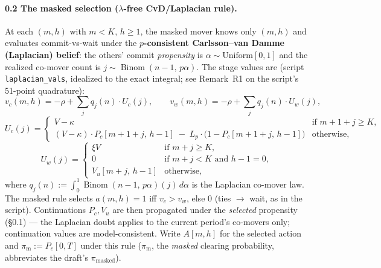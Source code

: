 \paragraph{0.2 The masked selection ($\lambda$-free CvD/Laplacian rule).}
At each $(m,h)$ with $m < K$, $h \ge 1$, the masked mover knows only $(m,h)$ and evaluates commit-vs-wait under the \textbf{$p$-consistent Carlsson--van Damme (Laplacian) belief}: the others' commit \emph{propensity} is $\alpha \sim \mathrm{Uniform}[0,1]$ and the realized co-mover count is $j \sim \operatorname{Binom}(n-1,\, p\alpha)$. The stage values are (script \texttt{laplacian\_vals}, idealized to the exact integral; see Remark~R1 on the script's 51-point quadrature):
\[
v_c(m,h) = -\rho + \sum_{j} q_j(n) \cdot U_c(j), \qquad
v_w(m,h) = -\rho + \sum_{j} q_j(n) \cdot U_w(j),
\]
\[
U_c(j) =
\begin{cases}
V - \kappa & \text{if } m+1+j \ge K,\\[2pt]
(V-\kappa)\cdot P_c[m+1+j,\, h-1] \;-\; L_p\cdot\bigl(1 - P_c[m+1+j,\, h-1]\bigr) & \text{otherwise,}
\end{cases}
\]
\[
U_w(j) =
\begin{cases}
\xi V & \text{if } m+j \ge K,\\[2pt]
0 & \text{if } m+j < K \text{ and } h-1 = 0,\\[2pt]
V_u[m+j,\, h-1] & \text{otherwise,}
\end{cases}
\]
where $q_j(n) := \int_0^1 \operatorname{Binom}(n-1,\, p\alpha)(j)\, d\alpha$ is the Laplacian co-mover law. The masked rule selects $a(m,h) = 1$ iff $v_c > v_w$, else $0$ (ties $\to$ wait, as in the script). Continuations $P_c, V_u$ are then propagated under the \emph{selected} propensity (\S 0.1) --- the Laplacian doubt applies to the current period's co-movers only; continuation values are model-consistent. Write $A[m,h]$ for the selected action and $\pi_{\mathrm{m}} := P_c[0,T]$ under this rule ($\pi_{\mathrm{m}}$, the \emph{masked} clearing probability, abbreviates the draft's $\pi_{\text{masked}}$).

